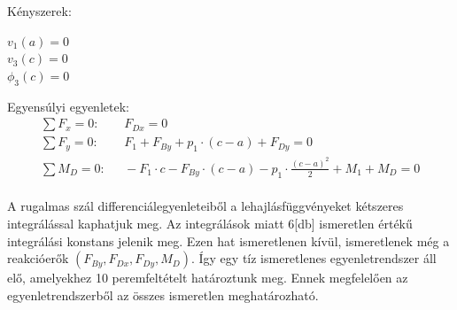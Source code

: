 \documentclass{article}
\begin{document}
		Kényszerek: 
		\begin{center}
			$v_1(a)=0$\\
			$v_3(c)=0$\\
			$\phi_3(c)=0$\\
		\end{center}
	
		Egyensúlyi egyenletek:
		\begin{align}
			\sum{F_x=0} :&\ \ \ F_{Dx}=0\\
			\sum{F_y=0} :&\ \ \ F_1+F_{By}+p_1\cdot(c-a)+F_{Dy}=0\\
			\sum{M_D=0} :&\ \ \ -F_1\cdot c-F_{By}\cdot(c-a)-p_1\cdot\frac{(c-a)^2}{2}+M_1+M_D=0
		\end{align}\\[10pt]		
		A rugalmas szál differenciálegyenleteiből a lehajlásfüggvényeket kétszeres integrálással kaphatjuk meg. Az integrálások miatt 6[db] ismeretlen értékű integrálási konstans jelenik meg. Ezen hat ismeretlenen kívül, ismeretlenek még a reakcióerők $(F_{By}, F_{Dx}, F_{Dy}, M_{D})$.
		Így egy tíz ismeretlenes egyenletrendszer áll elő, amelyekhez 10 peremfeltételt határoztunk meg. Ennek megfelelően az egyenletrendszerből az összes ismeretlen meghatározható.
		
\end{document}
